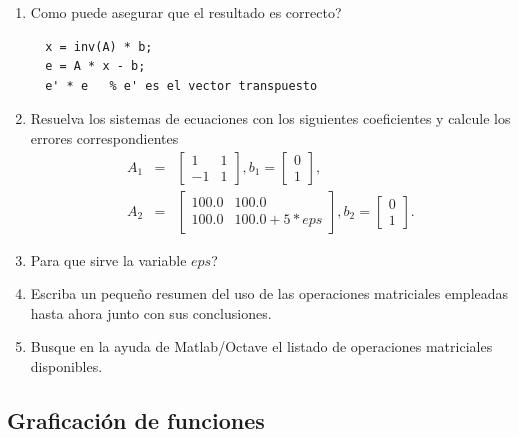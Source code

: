 \begin{enumerate}
\begin{enumerate}
\item Como puede asegurar que el resultado es correcto?
\begin{verbatim}
  x = inv(A) * b;
  e = A * x - b;
  e' * e   % e' es el vector transpuesto
\end{verbatim}

\item Resuelva los sistemas de ecuaciones con los siguientes
  coeficientes y calcule los errores correspondientes
  \begin{eqnarray}
    A_{1} &=&\left[
      \begin{array}{cc}
        1 & 1 \\
        -1 & 1
      \end{array}
    \right] ,b_{1}=\left[
      \begin{array}{c}
        0 \\
        1
      \end{array}
    \right] , \\
    A_{2} &=&\left[
      \begin{array}{cc}
        100.0 & 100.0                               \\
        100.0 & 100.0 + 5 * eps
      \end{array}
    \right] ,b_{2}=\left[
      \begin{array}{c}
        0 \\
        1
      \end{array}
    \right] .
  \end{eqnarray}

\item \textquestiondown Para que sirve la variable $eps$?

\item Escriba un peque\~{n}o resumen del uso de las operaciones
  matriciales empleadas hasta ahora junto con sus conclusiones.

\item Busque en la ayuda de Matlab/Octave el listado de operaciones
  matriciales disponibles.
\end{enumerate}

\end{enumerate}

\subsection{Graficaci\'{o}n de funciones}

